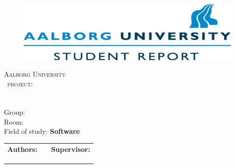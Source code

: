 \begin{titlepage}
	\begin{adjustwidth}{-1cm}{2cm}
	\begin{center}
		\begin{figure}
			\includegraphics{Pics/Logo.png}
		\end{figure}
		\vspace*{1.5cm}
		\textsc{\LARGE Aalborg University} \\[1.5cm]
		\textsc{\Large \SEMESTER\ project:} \\[0.5cm]
		\mbox{{\Huge \TITLE}}\\[.2cm]
		\mbox{{\Large \SUBJECT}}\\[2cm]
		Group: {\bf \GROUPNUMBER}\\
		Room: {\bf \GROUPROOM}\\[.5cm]
		Field of study: \textbf{Software}\\[1cm]
		\begin{tabular}{l l l}
			\textbf{Authors:}	&	\phantom{xxxxxxxxx}	&	\textbf{Supervisor:}\\
			\NAMEONE		&&	\SUPERVISOR\\
			\NAMETWO&\\			
			\NAMETHREE&\\
		\end{tabular}
	\vfill
	\ENDDATE
	\end{center}
	\end{adjustwidth}
\end{titlepage}